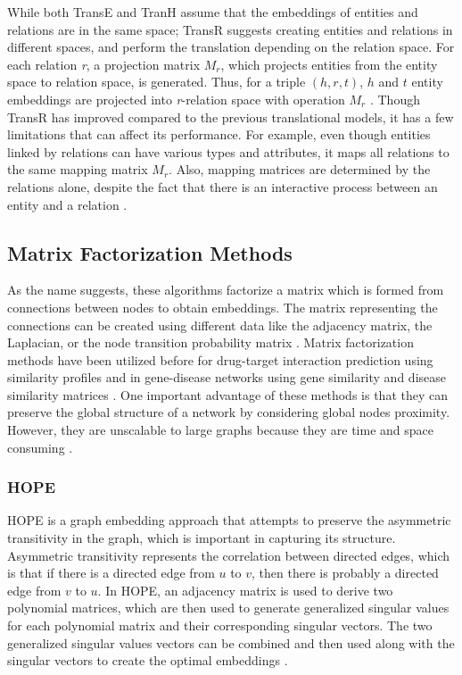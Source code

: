 While both TransE and TranH assume that the embeddings of entities and relations are in the same space; TransR suggests creating entities and relations in different spaces, and perform the translation depending on the relation space. For each relation \textit{r}, a projection matrix $M_{r}$, which projects entities from the entity space to relation space, is generated.
Thus, for a triple $(h, r, t)$, $h$ and $t$ entity embeddings are projected into \textit{r}-relation space with operation $M_{r}$ \cite{lin_learning_2015}.
Though TransR has improved compared to the previous translational models, it has a few limitations that can affect its performance. For example, even though entities linked by relations can have various types and attributes, it maps all relations to the same mapping matrix $M_{r}$. Also, mapping matrices are determined by the relations alone, despite the fact that there is an interactive process between an entity and a relation \cite{ji_knowledge_2015}.

\subsection{Matrix Factorization Methods}

As the name suggests, these algorithms factorize a matrix which is formed from connections between nodes to obtain embeddings. The matrix representing the connections can be created using different data like the adjacency matrix, the Laplacian, or the node transition probability matrix \cite{goyal_graph_2018}. Matrix factorization methods have been utilized before for drug-target interaction prediction using similarity profiles \cite{ezzat_drug-target_2017, yamanishi_dinies:_2014} and in gene-disease networks using gene similarity and disease similarity matrices \cite{zeng_probability-based_2017}. One important advantage of these methods is that they can preserve the global structure of a network by considering global nodes proximity. However, they are unscalable to large graphs because they are time and space consuming \cite{cai_comprehensive_2017}.

\subsubsection{HOPE}
\ac{HOPE} is a graph embedding approach that attempts to preserve the asymmetric transitivity in the graph, which is important in capturing its structure. Asymmetric transitivity represents the correlation between directed edges, which is that if there is a directed edge from $u$ to $v$, then there is probably a directed edge from $v$ to $u$. In \ac{HOPE}, an adjacency matrix is used to derive two polynomial matrices, which are then used to generate generalized singular values for each polynomial matrix and their corresponding singular vectors. The two generalized singular values vectors can be combined and then used along with the singular vectors to create the optimal embeddings \cite{ou_asymmetric_2016}.

